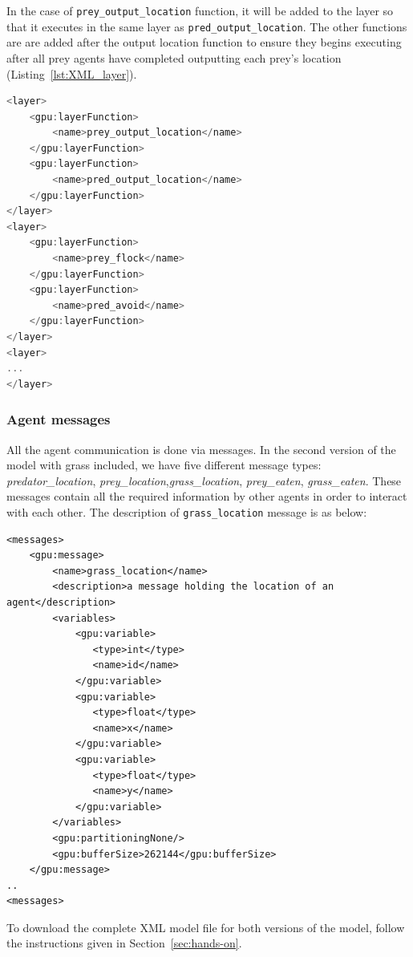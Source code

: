 In the case of \verb|prey_output_location| function, it will be added to the layer so that it executes in the same layer as \verb|pred_output_location|. The other functions are are added after the output location function to ensure they begins executing after all prey agents have completed outputting each prey's location (Listing~\ref{lst:XML_layer}).

\begin{lstlisting}[linewidth=\columnwidth,breaklines=true,language=C++,caption={},label=lst:XML_layer]
<layer>
    <gpu:layerFunction>
        <name>prey_output_location</name>
    </gpu:layerFunction>
    <gpu:layerFunction>
        <name>pred_output_location</name>
    </gpu:layerFunction>
</layer>
<layer>
    <gpu:layerFunction>
        <name>prey_flock</name>
	</gpu:layerFunction>
	<gpu:layerFunction>
        <name>pred_avoid</name>
	</gpu:layerFunction>
</layer>
<layer>
...
</layer>
\end{lstlisting}



\subsubsection{Agent messages}
All the agent communication is done via messages. In the second version of the model with grass included, we have five different message types: \textit{predator\_location}, \textit{prey\_location},\textit{grass\_location}, \textit{prey\_eaten}, \textit{grass\_eaten}. These messages contain all the required information by other agents in order to interact with each other. The description of \verb|grass_location| message is as below:
\begin{verbatim}
<messages>
    <gpu:message>
        <name>grass_location</name>
        <description>a message holding the location of an agent</description>
        <variables>
            <gpu:variable>
               <type>int</type>
               <name>id</name>
            </gpu:variable>
            <gpu:variable>
               <type>float</type>
               <name>x</name>
            </gpu:variable>
            <gpu:variable>
               <type>float</type>
               <name>y</name>
            </gpu:variable>
        </variables>
        <gpu:partitioningNone/>
        <gpu:bufferSize>262144</gpu:bufferSize>
    </gpu:message>
..
<messages>
\end{verbatim}

To download the complete XML model file for both versions of the model, follow the instructions given in Section~\ref{sec:hands-on}.

